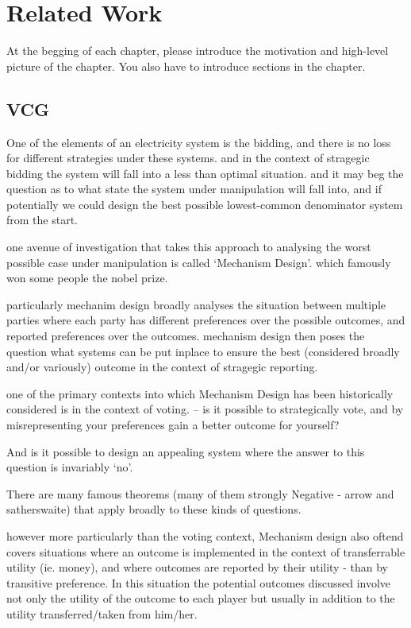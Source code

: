 \section{Related Work}
\label{cha:solutions}
At the begging of each chapter, please introduce the motivation and high-level
picture of the chapter. You also have to introduce sections in the
chapter. \\


\subsection{VCG}

One of the elements of an electricity system is the bidding, and there is no loss for different strategies under these systems.
and in the context of stragegic bidding the system will fall into a less than optimal situation.
and it may beg the question as to what state the system under manipulation will fall into, and if potentially we could design the best possible lowest-common denominator system from the start.

one avenue of investigation that takes this approach to analysing the worst possible case under manipulation is called `Mechanism Design'.
which famously won some people the nobel prize.

particularly mechanim design broadly analyses the situation between multiple parties where each party has different preferences over the possible outcomes, and reported preferences over the outcomes.
mechanism design then poses the question what systems can be put inplace to ensure the best (considered broadly and/or variously) outcome in the context of stragegic reporting.

one of the primary contexts into which Mechanism Design has been historically considered is in the context of voting. -- is it possible to strategically vote, and by misrepresenting your preferences gain a better outcome for yourself?

And is it possible to design an appealing system where the answer to this question is invariably `no'.

There are many famous theorems (many of them strongly Negative - arrow and satherswaite) that apply broadly to these kinds of questions.

however more particularly than the voting context, Mechanism design also oftend covers situations where an outcome is implemented in the context of transferrable utility (ie. money), and where outcomes are reported by their utility - than by transitive preference.
In this situation the potential outcomes discussed involve not only the utility of the outcome to each player but usually in addition to the utility transferred/taken from him/her.

